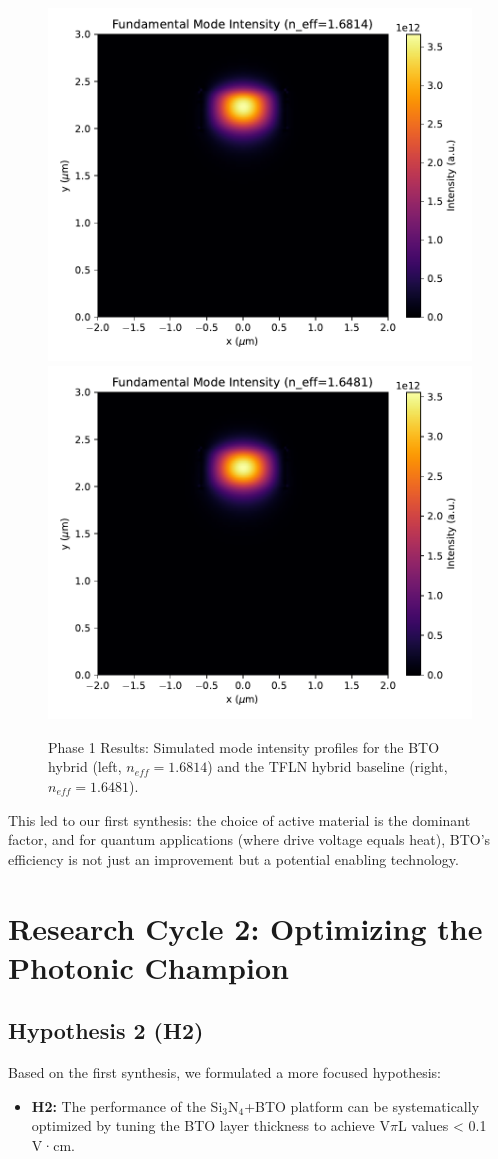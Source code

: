 \documentclass{article}
\begin{document}
\begin{figure}[H]
    \centering
    \includegraphics[width=0.49\linewidth]{simulation_intensity_BTO.pdf}
    \includegraphics[width=0.49\linewidth]{simulation_intensity_TFLN.pdf}
    \caption{Phase 1 Results: Simulated mode intensity profiles for the BTO hybrid (left, $n_{eff}=1.6814$) and the TFLN hybrid baseline (right, $n_{eff}=1.6481$).}
    \label{fig:cycle1_modes}
\end{figure}

This led to our first synthesis: the choice of active material is the dominant factor, and for quantum applications (where drive voltage equals heat), BTO's efficiency is not just an improvement but a potential enabling technology.

\section{Research Cycle 2: Optimizing the Photonic Champion}
\subsection{Hypothesis 2 (H2)}
Based on the first synthesis, we formulated a more focused hypothesis:
\begin{itemize}
    \item \textbf{H2:} The performance of the Si$_3$N$_4$+BTO platform can be systematically optimized by tuning the BTO layer thickness to achieve V$\pi$L values < 0.1 V·cm.
\end{itemize}
\end{document}
